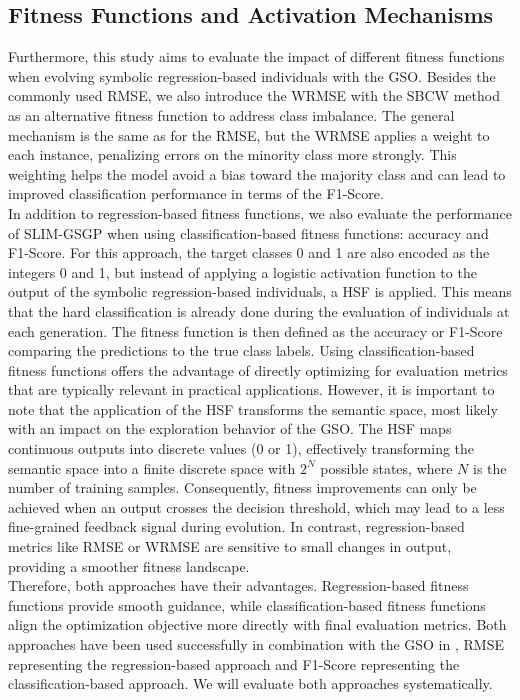 \documentclass[manuscript, review, anonymous]{acmart} %
\begin{document}
\subsection{Fitness Functions and Activation Mechanisms}
Furthermore, this study aims to evaluate the impact of different fitness functions when evolving symbolic 
regression-based individuals with the GSO. 
Besides the commonly used RMSE, we also introduce the WRMSE with the SBCW method as an alternative fitness function
to address class imbalance. The general mechanism is the same as for the RMSE, 
but the WRMSE applies a weight to each instance, penalizing errors on the minority class more strongly. 
This weighting helps the model avoid a bias toward the majority 
class and can lead to improved classification performance in terms of the F1-Score.\\
In addition to regression-based fitness functions, we also evaluate the performance of SLIM-GSGP
when using classification-based fitness functions: accuracy and F1-Score. 
For this approach, the target classes 0 and 1 are also encoded as the integers 0 and 1, 
but instead of applying a logistic activation function to the output of the symbolic regression-based individuals,
a HSF is applied. This means that the hard classification is already done during 
the evaluation of individuals at each generation. The fitness function is then
defined as the accuracy or F1-Score comparing the predictions to the true class labels.
Using classification-based fitness functions offers the advantage of directly 
optimizing for evaluation metrics that are typically relevant in practical applications. 
However, it is important to note that the application of the HSF transforms the semantic space, 
most likely with an impact on the exploration behavior of the GSO. 
The HSF maps continuous outputs into discrete values (0 or 1), 
effectively transforming the semantic space into a finite discrete space with $2^N$ possible states, 
where $N$ is the number of training samples. 
Consequently, fitness improvements can only be achieved when an output crosses the decision threshold, 
which may lead to a less fine-grained feedback signal during evolution.
In contrast, regression-based metrics like RMSE or WRMSE are sensitive to small changes in output,
providing a smoother fitness landscape.\\
Therefore, both approaches have their advantages. Regression-based fitness 
functions provide smooth guidance, 
while classification-based fitness functions align the optimization objective more directly with final evaluation metrics. 
Both approaches have been used successfully in combination with the GSO in \cite{Bakurov2022}, 
RMSE representing the regression-based approach and F1-Score representing the classification-based approach.
We will evaluate both approaches systematically.
\end{document}
